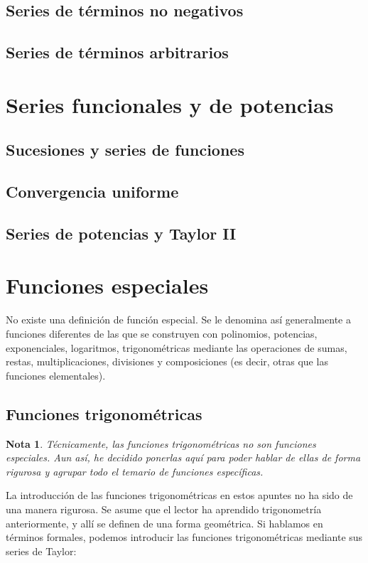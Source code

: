 \documentclass{article}
\newtheorem{note}{Nota}
\begin{document}
\subsection{Series de términos no negativos}

\subsection{Series de términos arbitrarios}





\section{Series funcionales y de potencias}

\subsection{Sucesiones y series de funciones}

\subsection{Convergencia uniforme}

\subsection{Series de potencias y Taylor II}


\newpage
\section{Funciones especiales}
No existe una definición de función especial. Se le denomina así generalmente a funciones diferentes de las que se construyen con polinomios, potencias, exponenciales, logaritmos, trigonométricas mediante las operaciones de sumas, restas, multiplicaciones, divisiones y composiciones (es decir, otras que las funciones elementales).


\subsection{Funciones trigonométricas}
\begin{note}
	Técnicamente, las funciones trigonométricas no son funciones especiales. Aun así, he decidido ponerlas aquí para poder hablar de ellas de forma rigurosa y agrupar todo el temario de funciones específicas.
\end{note}
La introducción de las funciones trigonométricas en estos apuntes no ha sido de una manera rigurosa. Se asume que el lector ha aprendido trigonometría anteriormente, y allí se definen de una forma geométrica. Si hablamos en términos formales, podemos introducir las funciones trigonométricas mediante sus series de Taylor:
\end{document}
